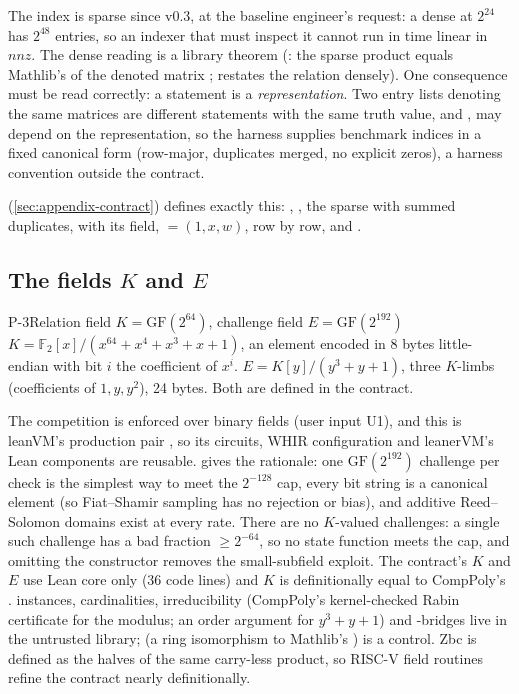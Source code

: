 \noindent The index is sparse since v0.3, at the baseline engineer's request: a dense
 at $2^{24}$ has $2^{48}$ entries, so an indexer that must inspect
it cannot run in time linear in $\mathit{nnz}$. The dense reading is a library theorem
(: the sparse product equals Mathlib's  of the denoted
matrix ;  restates the relation densely). One consequence must be
read correctly: a statement is a \emph{representation}. Two entry lists denoting the same matrices
are different statements with the same truth value, and ,  may depend on the
representation, so the harness supplies benchmark indices in a fixed canonical form (row-major,
duplicates merged, no explicit zeros), a harness convention outside the contract.

\noindent {} (\cref{sec:appendix-contract}) defines exactly this: ,
, the sparse  with summed duplicates,  with its
 field,  $=(1,x,w)$,  row by row, and .

\subsection{The fields \texorpdfstring{$K$}{K} and \texorpdfstring{$E$}{E}}\label{subsec:proto-fields}

\begin{decision}{P-3}{Relation field $K=\mathrm{GF}(2^{64})$, challenge field $E=\mathrm{GF}(2^{192})$}
$K=\mathbb{F}_2[x]/(x^{64}+x^4+x^3+x+1)$, an element encoded in 8 bytes little-endian with bit $i$
the coefficient of $x^i$. $E=K[y]/(y^3+y+1)$, three $K$-limbs (coefficients of $1,y,y^2$), 24
bytes. Both are defined in the contract.
\end{decision}

\noindent The competition is enforced over binary fields (user input U1), and this is leanVM's
production pair \cite{leanVM}, so its circuits, WHIR configuration and leanerVM's Lean components
are reusable.  gives the rationale: one $\mathrm{GF}(2^{192})$ challenge per
check is the simplest way to meet the $2^{-128}$ cap, every bit string is a canonical element (so
Fiat--Shamir sampling has no rejection or bias), and additive Reed--Solomon domains exist at every
rate. There are no $K$-valued challenges: a single such challenge has a bad fraction $\ge2^{-64}$, so no
state function meets the cap, and omitting the constructor removes the small-subfield exploit. The
contract's $K$ and $E$ use Lean core only (36 code lines) and $K$ is definitionally equal to CompPoly's
 \cite{comppoly2026}.  instances, cardinalities, irreducibility (CompPoly's
kernel-checked Rabin certificate for the modulus; an order argument for $y^3+y+1$) and
-bridges live in the untrusted library;  (a ring isomorphism to Mathlib's
) is a control. Zbc is defined as the halves of the same carry-less product, so
RISC-V field routines refine the contract nearly definitionally.

